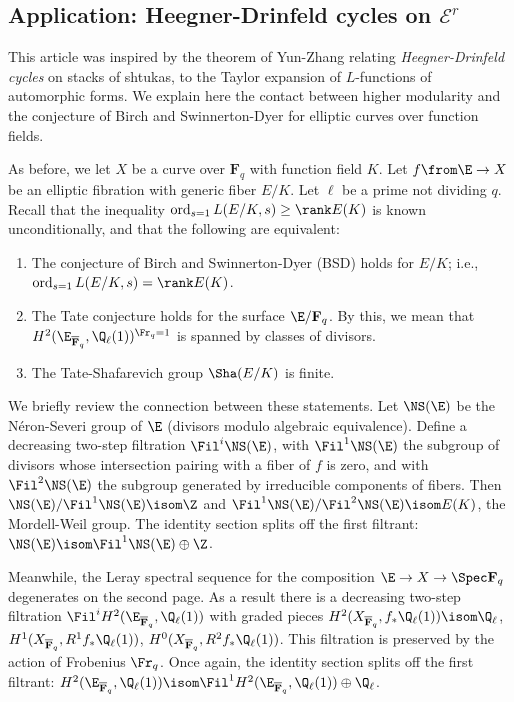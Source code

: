 \documentclass{article}
\def\F{\mathbf{F}}
\DeclareMathOperator{\ord}{ord}
\begin{document}
\subsection{Application:  Heegner-Drinfeld cycles on $\mathcal{E}^r$}
\label{sec:application}

This article was inspired by the theorem of Yun-Zhang \cite{YunZhangShtukasII} relating {\em Heegner-Drinfeld cycles} on stacks of shtukas, to the Taylor expansion of $L$-functions of automorphic forms.    We explain here the contact between higher modularity and the conjecture of Birch and Swinnerton-Dyer for elliptic curves over function fields.

As before, we let $X$ be a curve over $\F_q$ with function field $K$.   Let $f\from \E\to X$ be an elliptic fibration with generic fiber $E/K$.  Let $\ell$ be a prime not dividing $q$.  Recall \cite{TateBSD} that the inequality $\ord_{s=1}L(E/K,s)\geq \rank E(K)$ is known unconditionally, and that the following are equivalent:

\begin{enumerate}
\item The conjecture of Birch and Swinnerton-Dyer (BSD) holds for $E/K$;  i.e., $\ord_{s=1} L(E/K,s)=\rank E(K)$.  
\item The Tate conjecture holds for the surface $\E/\F_q$.  By this,  we mean that $H^2(\E_{\overline{\F}_q},\Q_\ell(1))^{\Fr_q=1}$ is spanned by classes of divisors.
\item The Tate-Shafarevich group $\Sha(E/K)$ is finite.
\end{enumerate}
We briefly review the connection between these statements.   Let $\NS(\E)$ be the N\'eron-Severi group of $\E$ (divisors modulo algebraic equivalence).  Define a decreasing two-step filtration $\Fil^i \NS(\E)$, with $\Fil^1\NS(\E)$ the subgroup of divisors whose intersection pairing with a fiber of $f$ is zero, and with $\Fil^2 \NS(\E)$ the subgroup generated by irreducible components of fibers.    Then $\NS(\E)/\Fil^1\NS(\E)\isom \Z$ and $\Fil^1\NS(\E)/\Fil^2\NS(\E)\isom E(K)$, the Mordell-Weil group.   The identity section splits off the first filtrant:  $\NS(\E)\isom \Fil^1\NS(\E)\oplus \Z$.

Meanwhile, the Leray spectral sequence for the composition $\E\to X\to \Spec \F_q$ degenerates on the second page.  As a result there is a decreasing two-step filtration $\Fil^i H^2(\E_{\overline{\F}_q},\Q_\ell(1))$ with graded pieces $H^2(X_{{\overline{\F}_q}},f_*\Q_\ell(1))\isom \Q_\ell$, $H^1(X_{\overline{\F}_q},R^1f_*\Q_\ell(1))$, $H^0(X_{{\overline{\F}_q}},R^2f_*\Q_\ell(1))$.   This filtration is preserved by the action of Frobenius $\Fr_q$.  Once again, the identity section splits off the first filtrant:  $H^2(\E_{\overline{\F}_q},\Q_\ell(1))\isom \Fil^1 H^2(\E_{\overline{\F}_q},\Q_\ell(1))\oplus \Q_\ell$.  
\end{document}
